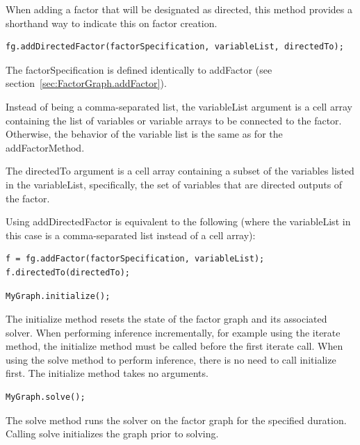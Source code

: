\fi

\ifmatlab
{}

When adding a factor that will be designated as directed, this method provides a shorthand way to indicate this on factor creation.

\begin{lstlisting}
fg.addDirectedFactor(factorSpecification, variableList, directedTo);
\end{lstlisting}

The factorSpecification is defined identically to addFactor (see section~\ref{sec:FactorGraph.addFactor}).

Instead of being a comma-separated list, the variableList argument is a cell array containing the list of variables or variable arrays to be connected to the factor.  Otherwise, the behavior of the variable list is the same as for the addFactorMethod.

The directedTo argument is a cell array containing a subset of the variables listed in the variableList, specifically, the set of variables that are directed outputs of the factor.

Using addDirectedFactor is equivalent to the following (where the variableList in this case is a comma-separated list instead of a cell array):

 \begin{lstlisting}
f = fg.addFactor(factorSpecification, variableList);
f.directedTo(directedTo);
\end{lstlisting}

\fi


\begin{lstlisting}
MyGraph.initialize();
\end{lstlisting}

The initialize method resets the state of the factor graph and its associated solver.  When performing inference incrementally, for example using the iterate method, the initialize method must be called before the first iterate call.  When using the solve method to perform inference, there is no need to call initialize first.  The initialize method takes no arguments.

\label{sec:FactorGraph.solve}

\begin{lstlisting}
MyGraph.solve();
\end{lstlisting}

The solve method runs the solver on the factor graph for the specified duration.  Calling solve initializes the graph prior to solving.

